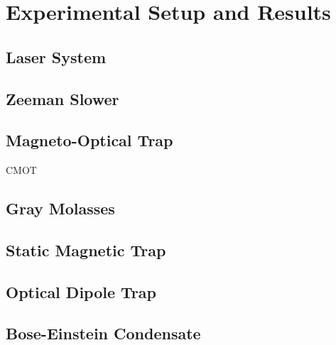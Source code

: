 \chapter{Experimental Setup and Results}

\section{Laser System}

\section{Zeeman Slower}

\section{Magneto-Optical Trap}

CMOT

\section{Gray Molasses}

\section{Static Magnetic Trap}

\section{Optical Dipole Trap}

\section{Bose-Einstein Condensate}
